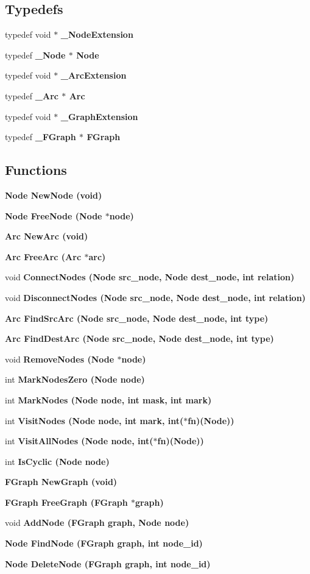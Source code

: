 \subsection*{Typedefs}
\begin{CompactItemize}
\item 
typedef void $\ast$ \bf{\_\-Node\-Extension}
\item 
typedef \bf{\_\-Node} $\ast$ \bf{Node}
\item 
typedef void $\ast$ \bf{\_\-Arc\-Extension}
\item 
typedef \bf{\_\-Arc} $\ast$ \bf{Arc}
\item 
typedef void $\ast$ \bf{\_\-Graph\-Extension}
\item 
typedef \bf{\_\-FGraph} $\ast$ \bf{FGraph}
\end{CompactItemize}
\subsection*{Functions}
\begin{CompactItemize}
\item 
\bf{Node} \bf{New\-Node} (void)
\item 
\bf{Node} \bf{Free\-Node} (\bf{Node} $\ast$\bf{node})
\item 
\bf{Arc} \bf{New\-Arc} (void)
\item 
\bf{Arc} \bf{Free\-Arc} (\bf{Arc} $\ast$arc)
\item 
void \bf{Connect\-Nodes} (\bf{Node} src\_\-node, \bf{Node} dest\_\-node, int relation)
\item 
void \bf{Disconnect\-Nodes} (\bf{Node} src\_\-node, \bf{Node} dest\_\-node, int relation)
\item 
\bf{Arc} \bf{Find\-Src\-Arc} (\bf{Node} src\_\-node, \bf{Node} dest\_\-node, int type)
\item 
\bf{Arc} \bf{Find\-Dest\-Arc} (\bf{Node} src\_\-node, \bf{Node} dest\_\-node, int type)
\item 
void \bf{Remove\-Nodes} (\bf{Node} $\ast$\bf{node})
\item 
int \bf{Mark\-Nodes\-Zero} (\bf{Node} \bf{node})
\item 
int \bf{Mark\-Nodes} (\bf{Node} \bf{node}, int mask, int mark)
\item 
int \bf{Visit\-Nodes} (\bf{Node} \bf{node}, int mark, int($\ast$fn)(\bf{Node}))
\item 
int \bf{Visit\-All\-Nodes} (\bf{Node} \bf{node}, int($\ast$fn)(\bf{Node}))
\item 
int \bf{Is\-Cyclic} (\bf{Node} \bf{node})
\item 
\bf{FGraph} \bf{New\-Graph} (void)
\item 
\bf{FGraph} \bf{Free\-Graph} (\bf{FGraph} $\ast$\bf{graph})
\item 
void \bf{Add\-Node} (\bf{FGraph} \bf{graph}, \bf{Node} \bf{node})
\item 
\bf{Node} \bf{Find\-Node} (\bf{FGraph} \bf{graph}, int node\_\-id)
\item 
\bf{Node} \bf{Delete\-Node} (\bf{FGraph} \bf{graph}, int node\_\-id)
\end{CompactItemize}



